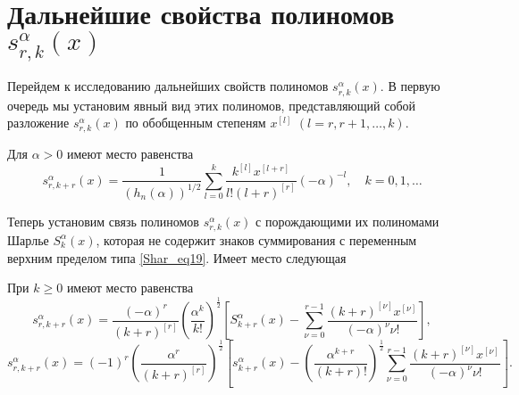 \section{Дальнейшие свойства полиномов $s_{r,k}^{\alpha}(x)$ }


Перейдем к исследованию дальнейших свойств полиномов $s_{r,k}^{\alpha}(x)$. В первую очередь мы установим явный вид этих полиномов, представляющий собой разложение $s_{r,k}^{\alpha}(x)$ по обобщенным степеням $x^{[l]}$ $(l=r,r+1,\ldots,k)$.
\begin{theorem}\label{Shar_thm3}
	Для $\alpha>0$ имеют место равенства
	$$ 	s_{r,k+r}^{\alpha}(x) = \frac{1}{(h_n(\alpha))^{1/2}} \sum_{l=0}^{k} \frac{k^{[l]}x^{[l+r]}}{l!(l+r)^{[r]}} (-\alpha)^{-l}, \quad k=0,1,\ldots	$$
\end{theorem}

Теперь установим связь полиномов $s_{r,k}^{\alpha}(x)$ с порождающими их полиномами Шарлье $S_{k}^{\alpha}(x)$, которая не содержит знаков суммирования с переменным верхним пределом типа \eqref{Shar_eq19}. Имеет место следующая
\begin{theorem}\label{Shar_thm4}
	При $k\geq 0$ имеют место равенства
	\begin{equation}\label{Shar_eq24}
	s_{r,k+r}^{\alpha}(x)=\frac{(-\alpha)^r}{(k+r)^{[r]}} \left( \frac{\alpha^k}{k!} \right)^{\frac 12} \left[S_{k+r}^{\alpha}(x)-\sum_{\nu=0}^{r-1}\frac{(k+r)^{[\nu]}x^{[\nu]}}{(-\alpha)^\nu \nu!}\right] ,
	\end{equation}
	\begin{equation}\label{Shar_eq25}
	s_{r,k+r}^{\alpha}(x)=(-1)^r \left(\frac{\alpha^r}{(k+r)^{[r]}}\right)^{\frac 12}
	\left[s_{k+r}^{\alpha}(x) - \left( \frac{\alpha^{k+r}}{(k+r)!} \right)^{\frac12}\sum_{\nu=0}^{r-1}\frac{(k+r)^{[\nu]}x^{[\nu]}}{(-\alpha)^\nu \nu!}\right] .
	\end{equation}
\end{theorem}
%
%
